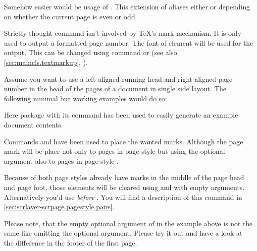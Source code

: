 Somehow easier would be usage of . This extension of
 aliases either  or 
depending on whether the current page is even or odd.

Strictly thought command  isn't involved by \TeX's mark
mechanism. It is only used to output a formatted page number.
%
The font of element
 will be used for
the output. This can be changed using command  or
 (see also \autoref{sec:maincls.textmarkup},
).%
%
%
\begin{Example}
  Assume you want to use a left aligned running head and right aligned page
  number in the head of the pages of a document in single side layout. The
  following minimal but working examples would do so:
  Here package  with its command
   has been used to easily
  generate an example document contents.

  Commands  and  have been used to place the wanted
  marks. Although the page mark will be place not only to pages in page style
   but using the optional argument also to pages in
  page style .

  Because of both page styles already have marks in the middle of the page
  head and page foot, those elements will be cleared using  and
   with empty arguments. Alternatively you'd use
   \emph{before} . You will find a
  description of this command in
  \autoref{sec:scrlayer-scrpage.pagestyle.pairs}.
\end{Example}

Please note, that the empty optional argument of
 in the example above is not the same like omitting the optional
argument. Please try it out and have a look at the difference in the footer of
the first page.%
%
%
%
%
%

